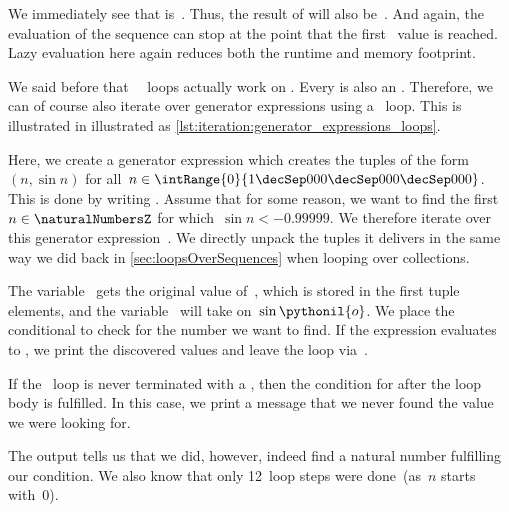 We immediately see that  is~.
Thus, the result of  will also be~.
And again, the evaluation of the sequence can stop at the point that the first~ value is reached.
Lazy evaluation here again reduces both the runtime and memory footprint.

%
%
%
We said before that \python\ ~loops actually work on .
Every  is also an .
Therefore, we can of course also iterate over generator expressions using a ~loop.
This is illustrated in  illustrated as \cref{lst:iteration:generator_expressions_loops}.

Here, we create a generator expression  which creates the tuples of the form~$(n,\sin{n})$ for all~$n\in\intRange{0}{1\decSep000\decSep000\decSep000}$.
This is done by writing .
Assume that for some reason, we want to find the first~$n\in\naturalNumbersZ$ for which~$\sin{n} < -0.99999$.
We therefore iterate over this generator expression~.
We directly unpack the tuples it delivers in the same way we did back in \cref{sec:loopsOverSequences} when looping over collections.

The variable~ gets the original value of~, which is stored in the first tuple elements, and the variable~ will take on~$\sin{\pythonil{o}}$.
We place the conditional  to check for the number we want to find.
If the expression  evaluates to , we print the discovered values and leave the loop via~.

If the ~loop is never terminated with a , then the condition for  after the loop body is fulfilled.
In this case, we print a message that we never found the value we were looking for.

The output  tells us that we did, however, indeed find a natural number fulfilling our condition.
We also know that only 12~loop steps were done~(as~$n$ starts with~0).

